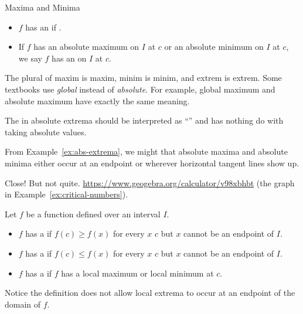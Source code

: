 \documentclass[../main.tex]{subfiles}
\begin{document}
\begin{lesson}{Maxima and Minima}
\begin{mdframed}[style=withref-compact]
\begin{itemize}
      \item \(f\) has an  if \underline{\hspace{2.5in}}.

      \item If \(f\) has an absolute maximum on \(I\) at \(c\) or an absolute minimum on \(I\) at \(c\), we say \(f\) has an  on \(I\) at \(c\).
    \end{itemize}
  \end{mdframed}

  The plural of maxim is maxim, minim is minim, and extrem is extrem.  Some textbooks use \emph{global} instead of \emph{absolute}. For example, global maximum and absolute maximum have exactly the same meaning.

  \faExclamationTriangle{} The  in absolute extrema should be interpreted as ``'' and has nothing do with taking absolute values.
  \clearpage

  From Example~\ref{ex:abs-extrema}, we might  that absolute maxima and absolute minima either occur at an endpoint or wherever horizontal tangent lines show up.

  Close! But not quite. \url{https://www.geogebra.org/calculator/v98xbhbt} (the graph in Example~\ref{ex:critical-numbers}).

  \begin{mdframed}[style=withref-compact]
    Let \(f\) be a function defined over an interval \(I\).

    \begin{itemize}[noitemsep]
      \item \(f\) has a  if \(f(c) \ge f(x)\) for every \(x\)  \(c\) but \(x\) cannot be an endpoint of \(I\).
      \item \(f\) has a  if \(f(c) \le f(x)\) for every \(x\)  \(c\) but \(x\) cannot be an endpoint of \(I\).
      \item \(f\) has a  if \(f\) has a local maximum or local minimum at \(c\).
    \end{itemize}

  \end{mdframed}
  \faExclamationTriangle{} Notice the definition does not allow local extrema to occur at an endpoint of the domain of \(f\).


\end{lesson}
\end{document}
